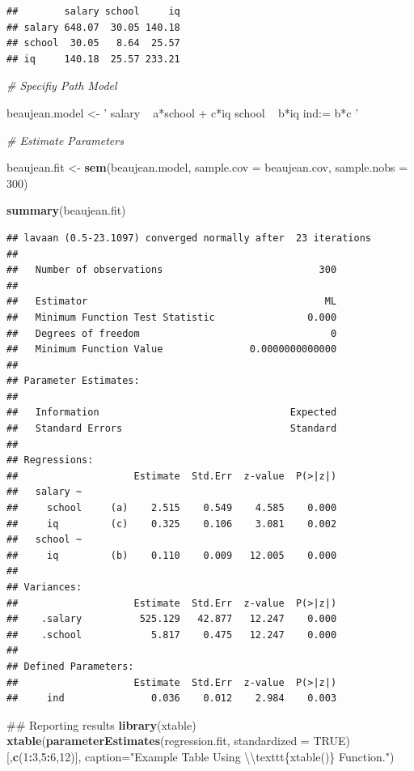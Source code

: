 \documentclass[]{book}
\newenvironment{Shaded}{\begin{snugshade}}{\end{snugshade}}
\newcommand{\KeywordTok}[1]{\textcolor[rgb]{0.13,0.29,0.53}{\textbf{#1}}}
\newcommand{\DataTypeTok}[1]{\textcolor[rgb]{0.13,0.29,0.53}{#1}}
\newcommand{\DecValTok}[1]{\textcolor[rgb]{0.00,0.00,0.81}{#1}}
\newcommand{\CharTok}[1]{\textcolor[rgb]{0.31,0.60,0.02}{#1}}
\newcommand{\StringTok}[1]{\textcolor[rgb]{0.31,0.60,0.02}{#1}}
\newcommand{\CommentTok}[1]{\textcolor[rgb]{0.56,0.35,0.01}{\textit{#1}}}
\newcommand{\OtherTok}[1]{\textcolor[rgb]{0.56,0.35,0.01}{#1}}
\newcommand{\OperatorTok}[1]{\textcolor[rgb]{0.81,0.36,0.00}{\textbf{#1}}}
\newcommand{\NormalTok}[1]{#1}
\theoremstyle{definition}
\theoremstyle{definition}
\theoremstyle{definition}
\theoremstyle{remark}
\begin{document}
\begin{verbatim}
##        salary school     iq
## salary 648.07  30.05 140.18
## school  30.05   8.64  25.57
## iq     140.18  25.57 233.21
\end{verbatim}

\begin{Shaded}
\begin{Highlighting}[]
\CommentTok{# Specifiy Path Model }

\NormalTok{beaujean.model <-}\StringTok{ '}
\StringTok{salary ~ a*school + c*iq}
\StringTok{school ~ b*iq}
\StringTok{ind:= b*c}
\StringTok{'}

\CommentTok{# Estimate Parameters }

\NormalTok{beaujean.fit <-}\StringTok{ }\KeywordTok{sem}\NormalTok{(beaujean.model, }\DataTypeTok{sample.cov =}\NormalTok{ beaujean.cov, }\DataTypeTok{sample.nobs =} \DecValTok{300}\NormalTok{)}

\KeywordTok{summary}\NormalTok{(beaujean.fit)}
\end{Highlighting}
\end{Shaded}

\begin{verbatim}
## lavaan (0.5-23.1097) converged normally after  23 iterations
## 
##   Number of observations                           300
## 
##   Estimator                                         ML
##   Minimum Function Test Statistic                0.000
##   Degrees of freedom                                 0
##   Minimum Function Value               0.0000000000000
## 
## Parameter Estimates:
## 
##   Information                                 Expected
##   Standard Errors                             Standard
## 
## Regressions:
##                    Estimate  Std.Err  z-value  P(>|z|)
##   salary ~                                            
##     school     (a)    2.515    0.549    4.585    0.000
##     iq         (c)    0.325    0.106    3.081    0.002
##   school ~                                            
##     iq         (b)    0.110    0.009   12.005    0.000
## 
## Variances:
##                    Estimate  Std.Err  z-value  P(>|z|)
##    .salary          525.129   42.877   12.247    0.000
##    .school            5.817    0.475   12.247    0.000
## 
## Defined Parameters:
##                    Estimate  Std.Err  z-value  P(>|z|)
##     ind               0.036    0.012    2.984    0.003
\end{verbatim}

\begin{Shaded}
\begin{Highlighting}[]
\NormalTok{## Reporting results}
\KeywordTok{library}\NormalTok{(xtable)}
\KeywordTok{xtable}\NormalTok{(}\KeywordTok{parameterEstimates}\NormalTok{(regression.fit, }\DataTypeTok{standardized =} \OtherTok{TRUE}\NormalTok{)[,}\KeywordTok{c}\NormalTok{(}\DecValTok{1}\OperatorTok{:}\DecValTok{3}\NormalTok{,}\DecValTok{5}\OperatorTok{:}\DecValTok{6}\NormalTok{,}\DecValTok{12}\NormalTok{)], }\DataTypeTok{caption=}\StringTok{"Example Table Using }\CharTok{\textbackslash{}\textbackslash{}}\StringTok{texttt\{xtable()\} Function."}\NormalTok{)}
\end{Highlighting}
\end{Shaded}
\end{document}

